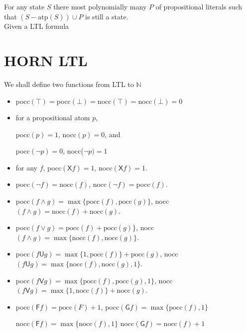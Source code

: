 \documentclass[12pt]{article}
\begin{document}
\begin{CJK*}{GBK}{song}
For any state $S$ there most polynomially many $P$ of propositional literals such that $(S-\mbox{atp}(S))\cup P$ is still a state.\\


Given a LTL formula

\color{black}

\section{HORN LTL}

We shall define two functions from LTL to $\mathbb{N}$
\begin{itemize}

\item pocc$(\top)=$pocc$(\bot)=$nocc$(\top)=$nocc$(\bot)=0$

\item for a propositional atom $p$,

pocc$(p)=1$, nocc$(p)=0$, and

pocc$(\neg p)=0$, nocc($\neg p)=1$

\item for any $f$, pocc$(\textsf{X}f)=1$, nocc$(\textsf{X}f)=1$.


\item pocc$(\neg f)=$nocc$(f)$, nocc$(\neg f)=$pocc$(f)$.


\item pocc$(f\wedge g)=\max\{\mbox{pocc}(f), \mbox{pocc}(g)\}$, nocc$(f\wedge g)=\mbox{nocc}(f)+\mbox{nocc}(g)$.

\item pocc$(f\vee g)=\mbox{pocc}(f)+\mbox{pocc}(g)\}$, nocc$(f\wedge g)=\max\{\mbox{nocc}(f), \mbox{nocc}(g)\}$.

\item pocc$(f\textsf{U}g)=\max\{1,\mbox{pocc}(f)\}+\mbox{pocc}(g)$, nocc$(f\textsf{U} g)=\max\{\mbox{nocc}(f),\mbox{nocc}(g),1\}$.

\item pocc$(f\textsf{V}g)=\max\{\mbox{pocc}(f), \mbox{pocc}(g),1\}$, nocc$(f\textsf{V} g)=\max\{1,\mbox{nocc}(f)\}+\mbox{nocc}(g)$.

\item pocc$(\textsf{F} f)=\mbox{pocc}(F)+1$, \mbox{pocc}$(\textsf{G}f)=\max\{\mbox{pocc}(f),1\}$

nocc$(\textsf{F}f)=\max\{\mbox{nocc}(f),1\}$   \mbox{nocc}$(\textsf{G}f)=\mbox{nocc}(f)+1$

\end{itemize}



\end{CJK*}
\end{document}
